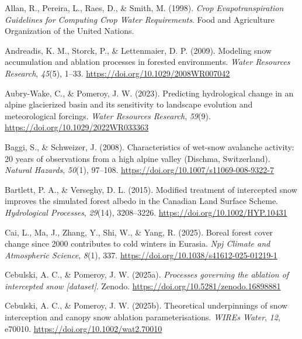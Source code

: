 \documentclass[
]{agujournal2019}
\newlength{\cslhangindent}
\newenvironment{CSLReferences}[2] %
 {\begin{list}{}{%
  \setlength{\itemindent}{0pt}
  \setlength{\leftmargin}{0pt}
  \setlength{\parsep}{0pt}
  \ifodd #1
   \setlength{\leftmargin}{\cslhangindent}
   \setlength{\itemindent}{-1\cslhangindent}
  \fi
  \setlength{\itemsep}{#2\baselineskip}}}
 {\end{list}}
\begin{document}
\label{refs}
\begin{CSLReferences}{1}{0}
Allan, R., Pereira, L., Raes, D., \& Smith, M. (1998). \emph{Crop
{Evapotranspiration Guidelines} for {Computing Crop Water
Requirements}}. {Food and Agriculture Organization of the United
Nations}.

Andreadis, K. M., Storck, P., \& Lettenmaier, D. P. (2009). Modeling
snow accumulation and ablation processes in forested environments.
\emph{Water Resources Research}, \emph{45}(5), 1--33.
\url{https://doi.org/10.1029/2008WR007042}

Aubry-Wake, C., \& Pomeroy, J. W. (2023). Predicting hydrological change
in an alpine glacierized basin and its sensitivity to landscape
evolution and meteorological forcings. \emph{Water Resources Research},
\emph{59}(9). \url{https://doi.org/10.1029/2022WR033363}

Baggi, S., \& Schweizer, J. (2008). Characteristics of wet-snow
avalanche activity: 20 years of observations from a high alpine valley
({Dischma}, {Switzerland}). \emph{Natural Hazards}, \emph{50}(1),
97--108. \url{https://doi.org/10.1007/s11069-008-9322-7}

Bartlett, P. A., \& Verseghy, D. L. (2015). Modified treatment of
intercepted snow improves the simulated forest albedo in the {Canadian
Land Surface Scheme}. \emph{Hydrological Processes}, \emph{29}(14),
3208--3226. \url{https://doi.org/10.1002/HYP.10431}

Cai, L., Ma, J., Zhang, Y., Shi, W., \& Yang, R. (2025). Boreal forest
cover change since 2000 contributes to cold winters in {Eurasia}.
\emph{Npj Climate and Atmospheric Science}, \emph{8}(1), 337.
\url{https://doi.org/10.1038/s41612-025-01219-1}

Cebulski, A. C., \& Pomeroy, J. W. (2025a). \emph{Processes governing
the ablation of intercepted snow {[}dataset{]}}. Zenodo.
\url{https://doi.org/10.5281/zenodo.16898881}

Cebulski, A. C., \& Pomeroy, J. W. (2025b). Theoretical underpinnings of
snow interception and canopy snow ablation parameterisations.
\emph{WIREs Water}, \emph{12}, e70010.
\url{https://doi.org/10.1002/wat2.70010}


\end{CSLReferences}
\end{document}
